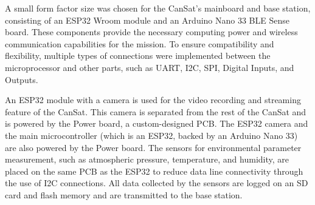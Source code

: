 \documentclass[11pt]{article}
\begin{document}
A small form factor size was chosen for the CanSat's mainboard and base station, consisting of an ESP32 Wroom module and an Arduino Nano 33 BLE Sense board. These components provide the necessary computing power and wireless communication capabilities for the mission. To ensure compatibility and flexibility, multiple types of connections were implemented between the microprocessor and other parts, such as UART, I2C, SPI, Digital Inputs, and Outputs.

An ESP32 module with a camera is used for the video recording and streaming feature of the CanSat. This camera is separated from the rest of the CanSat and is powered by the Power board, a custom-designed PCB. The ESP32 camera and the main microcontroller (which is an ESP32, backed by an Arduino Nano 33) are also powered by the Power board. The sensors for environmental parameter measurement, such as atmospheric pressure, temperature, and humidity, are placed on the same PCB as the ESP32 to reduce data line connectivity through the use of I2C connections. All data collected by the sensors are logged on an SD card and flash memory and are transmitted to the base station.
\end{document}
